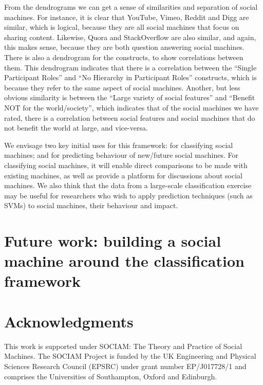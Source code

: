 \documentclass{sig-alternate}
\begin{document}
From the dendrograms we can get a sense of similarities and separation of social machines. For
instance, it is clear that YouTube, Vimeo, Reddit and Digg are similar, which is logical, because
they are all social machines that focus on sharing content. Likewise, Quora and StackOverflow
are also similar, and again, this makes sense, because they are both question answering social
machines. There is also a dendrogram for the constructs, to show correlations between them. This
dendrogram indicates that there is a correlation between the ``Single Participant Roles'' and
``No Hierarchy in Participant Roles'' constructs, which is because they refer to the same
aspect of social machines. Another, but less obvious similarity is between the ``Large variety of
social features'' and ``Benefit NOT for the world/society'', which indicates that of the social
machines we have rated, there is a correlation between social features and social machines that
do not benefit the world at large, and vice-versa.

We envisage two key initial uses for this framework: for classifying social machines; and for
predicting behaviour of new/future social machines. For classifying social machines, it will
enable direct comparisons to be made with existing machines, as well as provide a platform
for discussions about social machines. We also think that the data from a large-scale classification
exercise may be useful for researchers who wish to apply prediction techniques (such as SVMs)
to social machines, their behaviour and impact.


\section{Future work: building a social machine around the classification framework}




\section{Acknowledgments}

This work is supported under SOCIAM: The Theory and Practice of Social Machines.  The SOCIAM Project is funded by the UK Engineering and Physical Sciences Research Council (EPSRC) under grant number EP/J017728/1 and comprises the Universities of Southampton, Oxford and Edinburgh.

%

%
%


\balancecolumns %
\end{document}
